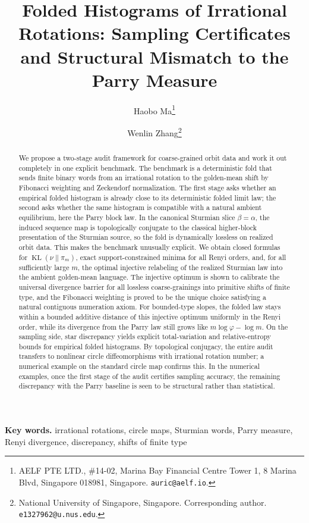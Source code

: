 \documentclass[11pt,letterpaper]{article}
\title{Folded Histograms of Irrational Rotations: Sampling Certificates and Structural Mismatch to the Parry Measure}
\author{Haobo Ma\thanks{AELF PTE LTD., \#14-02, Marina Bay Financial Centre Tower 1, 8 Marina Blvd, Singapore 018981, Singapore. \texttt{auric@aelf.io}.}
\and
Wenlin Zhang\thanks{National University of Singapore, Singapore. Corresponding author. \texttt{e1327962@u.nus.edu}.}}
\date{}
\numberwithin{equation}{section}
\theoremstyle{plain}
\theoremstyle{definition}
\theoremstyle{remark}
\DeclareMathOperator{\KL}{KL}
\begin{document}
\maketitle

\begin{abstract}
We propose a two-stage audit framework for coarse-grained orbit data and work
it out completely in one explicit benchmark. The benchmark is a deterministic
fold that sends finite binary words from an irrational rotation to the
golden-mean shift by Fibonacci weighting and Zeckendorf normalization. The
first stage asks whether an empirical folded histogram is already close to its
deterministic folded limit law; the second asks whether the same histogram is
compatible with a natural ambient equilibrium, here the Parry block law. In
the canonical Sturmian slice \(\beta=\alpha\), the induced sequence map is
topologically conjugate to the classical higher-block presentation of the
Sturmian source, so the fold is dynamically lossless on realized orbit data.
This makes the benchmark unusually explicit. We obtain closed formulas for
\(\KL(\nu\|\pi_m)\), exact support-constrained minima for all Renyi orders, and,
for all sufficiently large \(m\), the optimal injective relabeling of the
realized Sturmian law into the ambient golden-mean language. The injective
optimum is shown to calibrate the universal divergence barrier for all lossless
coarse-grainings into primitive shifts of finite type, and the Fibonacci
weighting is proved to be the unique choice satisfying a natural contiguous
numeration axiom. For bounded-type slopes, the folded law stays within a
bounded additive distance of this injective optimum uniformly in the Renyi
order, while its divergence from the Parry law still grows like
\(m\log\varphi-\log m\). On the sampling side, star discrepancy yields
explicit total-variation and relative-entropy bounds for empirical folded
histograms. By topological conjugacy, the entire audit transfers to nonlinear
circle diffeomorphisms with irrational rotation number; a numerical example on
the standard circle map confirms this. In the numerical examples, once the
first stage of the audit certifies sampling accuracy, the remaining
discrepancy with the Parry baseline is seen to be structural rather than
statistical.
\end{abstract}

\medskip
\noindent\textbf{Key words.} irrational rotations, circle maps, Sturmian
words, Parry measure, Renyi divergence, discrepancy, shifts of finite type
\end{document}
